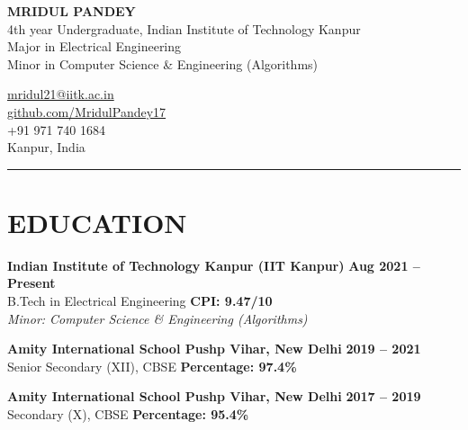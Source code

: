 \documentclass[a4paper,10pt]{article}
\begin{document}
\noindent
\begin{minipage}[t]{0.65\textwidth}
    {\LARGE \textbf{MRIDUL PANDEY}} \\
    4th year Undergraduate, Indian Institute of Technology Kanpur \\
    Major in Electrical Engineering \\
    Minor in Computer Science \& Engineering (Algorithms)
\end{minipage}
\begin{minipage}[t]{0.35\textwidth}
    \flushright
    \href{mailto:mridul21@iitk.ac.in}{mridul21@iitk.ac.in} \\
    \href{https://github.com/MridulPandey17}{github.com/MridulPandey17} \\
    +91 971 740 1684 \\
    Kanpur, India
\end{minipage}

\vspace{2mm} %
\hrule
\vspace{2mm}

\section*{EDUCATION}
\noindent
\textbf{Indian Institute of Technology Kanpur (IIT Kanpur)} \hfill \textbf{Aug 2021 -- Present} \\
B.Tech in Electrical Engineering \hfill \textbf{CPI: 9.47/10} \\
\textit{Minor: Computer Science \& Engineering (Algorithms)} \\
\vspace{2mm}

\textbf{Amity International School Pushp Vihar, New Delhi} \hfill \textbf{2019 -- 2021} \\
Senior Secondary (XII), CBSE \hfill \textbf{Percentage: 97.4\%} \\
\vspace{2mm}

\textbf{Amity International School Pushp Vihar, New Delhi} \hfill \textbf{2017 -- 2019} \\
Secondary (X), CBSE \hfill \textbf{Percentage: 95.4\%}

\end{document}
